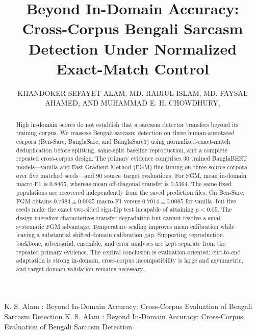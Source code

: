 \documentclass{ieeeaccess}
\makeatletter
\providecommand{\history}[1]{\gdef\@history{#1}}
\providecommand{\doi}[1]{\gdef\@doi{#1}}
\providecommand{\@history}{}
\providecommand{\@doi}{}
\makeatother
\begin{document}
\history{}
\doi{}

\title{Beyond In-Domain Accuracy: Cross-Corpus Bengali Sarcasm Detection Under Normalized Exact-Match Control}

\author{\uppercase{Khandoker Sefayet Alam},
\uppercase{Md. Rabiul Islam},
\uppercase{Md. Faysal Ahamed},
AND \uppercase{Muhammad E. H. Chowdhury},
}

\address[1]{Department of Computer Science and Engineering, Rajshahi University of Engineering and Technology (RUET), Rajshahi 6204, Bangladesh (e-mail: 2003121@student.ruet.ac.bd; rabiul.cse@gmail.com)}
\address[2]{Department of Electrical and Computer Engineering, Rajshahi University of Engineering and Technology (RUET), Rajshahi 6204, Bangladesh (e-mail: faysal.ahamed@ece.ruet.ac.bd)}
\address[3]{Department of Electrical Engineering, College of Engineering, Qatar University, Doha 2713, Qatar (e-mail: mchowdhury@qu.edu.qa)}


\markboth
{K. S. Alam \headeretal: Beyond In-Domain Accuracy: Cross-Corpus Evaluation of Bengali Sarcasm Detection}
{K. S. Alam \headeretal: Beyond In-Domain Accuracy: Cross-Corpus Evaluation of Bengali Sarcasm Detection}



\begin{abstract}
High in-domain scores do not establish that a sarcasm detector transfers beyond its training corpus. We reassess Bengali sarcasm detection on three human-annotated corpora (Ben-Sarc, BanglaSarc, and BanglaSarc3) using normalized-exact-match deduplication before splitting, same-split baseline reproduction, and a complete repeated cross-corpus design. The primary evidence comprises 30 trained BanglaBERT models---vanilla and Fast Gradient Method (FGM) fine-tuning on three source corpora over five matched seeds---and 90 source--target evaluations. For FGM, mean in-domain macro-F1 is 0.8465, whereas mean off-diagonal transfer is 0.5364. The same fixed populations are recovered independently from the saved prediction files. On Ben-Sarc, FGM obtains $0.7984\pm0.0035$ macro-F1 versus $0.7914\pm0.0085$ for vanilla, but five seeds make the exact two-sided sign-flip test incapable of attaining $p<0.05$. The design therefore characterizes transfer degradation but cannot resolve a small systematic FGM advantage. Temperature scaling improves mean calibration while leaving a substantial shifted-domain calibration gap. Supporting reproduction, backbone, adversarial, ensemble, and error analyses are kept separate from the repeated primary evidence. The central conclusion is evaluation-oriented: end-to-end adaptation is strong in-domain, cross-corpus incompatibility is large and asymmetric, and target-domain validation remains necessary.
\end{abstract}
\end{document}

